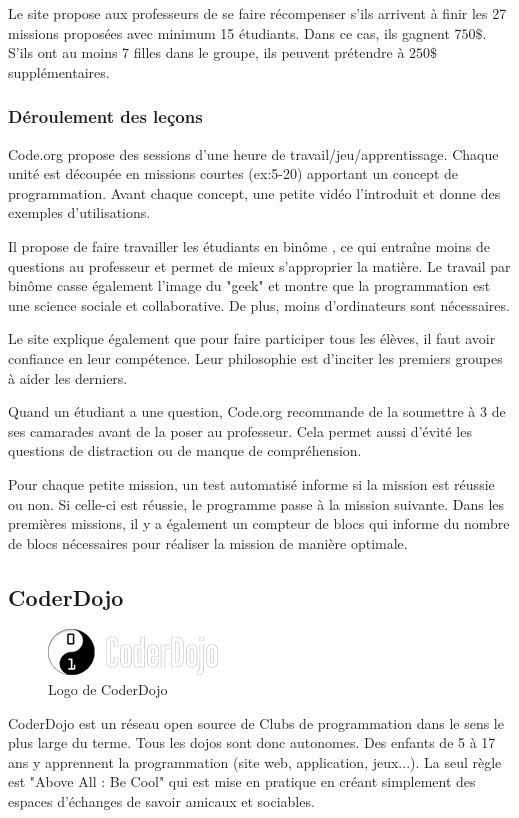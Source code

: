 Le site propose aux professeurs de se faire récompenser s'ils arrivent à finir les 27 missions proposées avec minimum 15 étudiants. Dans ce cas, ils gagnent $750\$$. S'ils ont au moins 7 filles dans le groupe, ils peuvent prétendre à $250\$$ supplémentaires.

\subsubsection{Déroulement des leçons}
Code.org propose des sessions d'une heure de travail/jeu/apprentissage. Chaque unité est découpée en missions courtes (ex:5-20) apportant un concept de programmation. Avant chaque concept, une petite vidéo l'introduit et donne des exemples d'utilisations.

Il propose de faire travailler les étudiants en binôme \cite{wiki-pair-prog}, ce qui entraîne moins de questions au professeur et permet de mieux s'approprier la matière. Le travail par binôme casse également l'image du "geek" et montre que la programmation est une science sociale et collaborative. De plus, moins d'ordinateurs sont nécessaires.

Le site explique également que pour faire participer tous les élèves, il faut avoir confiance en leur compétence. Leur philosophie est d'inciter les premiers groupes à aider les derniers.

Quand un étudiant a une question, Code.org recommande de la soumettre à 3 de ses camarades avant de la poser au professeur. Cela permet aussi d'évité les questions de distraction ou de manque de compréhension.

Pour chaque petite mission, un test automatisé informe si la mission est réussie ou non. Si celle-ci est réussie, le programme passe à la mission suivante. Dans les premières missions, il y a également un compteur de blocs qui informe du nombre de blocs nécessaires pour réaliser la mission de manière optimale.

\subsection{CoderDojo}
\begin{figure}[!ht]
  \begin{center}
    \includegraphics[scale=0.5]{content/5-related_work/images/dojo}
    \caption{Logo de CoderDojo}
    \label{fig:coder dojo}
  \end{center}
\end{figure}
CoderDojo \cite{dojo-about} est un réseau open source de Clubs de programmation dans le sens le plus large du terme. Tous les dojos sont donc autonomes. Des enfants de 5 à 17 ans y apprennent la programmation (site web, application, jeux...). La seul règle est "Above All : Be Cool" qui est mise en pratique en créant simplement des espaces d'échanges de savoir amicaux et sociables.

